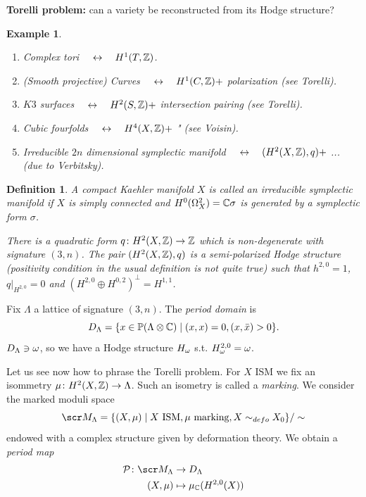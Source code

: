 \documentclass[A4paper, british, reqno]{amsart}
\theoremstyle{darkgreentheorem}
\theoremstyle{darkbluedefinition}
\newtheorem{defn}[thm]{Definition}
\theoremstyle{darkredexample}
\newtheorem{exa}[thm]{Example}
\theoremstyle{remark}
\newcommand{\1}{\mathbbm{1}}
\newcommand{\ot}{\otimes}
\newcommand{\op}{\oplus}
\newcommand{\prp}{^{\perp}}
\begin{document}
\textbf{Torelli problem:} can a variety be reconstructed from its Hodge structure?

\begin{exa}
    \begin{enumerate}
	\item Complex tori $\quad \leftrightarrow \quad H^{1}(T,\mathbb{Z})$.
	\item (Smooth projective) Curves $\quad \leftrightarrow \quad H^{1}(C,\mathbb{Z})+$ polarization (see Torelli).
	\item $K3$ surfaces $\quad \leftrightarrow \quad H^{2}(S,\mathbb{Z})+$ intersection pairing (see Torelli).
	\item Cubic fourfolds $\quad \leftrightarrow \quad H^{4}(X,\mathbb{Z})+$ " (see Voisin).
	\item Irreducible $2n$ dimensional symplectic manifold $\quad \leftrightarrow \quad (H^{2}(X,\mathbb{Z}),q)+$ ... (due to Verbitsky).
    \end{enumerate}
\end{exa}

\begin{defn}
    A compact Kaehler manifold $X$ is called an \textit{irreducible symplectic manifold} if $X$ is simply connected and $H^{0}(\Omega_{X}^{2})=\mathbb{C}\sigma $ is generated by a symplectic form $\sigma$.

    There is a quadratic form $q\colon H^{2}(X,\mathbb{Z})\to \mathbb{Z}$ which is non-degenerate with signature $(3,n)$.
    The pair $(H^{2}(X,\mathbb{Z}),q)$ is a semi-polarized Hodge structure (positivity condition in the usual definition is not quite true) such that $h^{2,0}=1$, $q|_{H^{2,0}}=0$ and $(H^{2,0}\op H^{0,2})\prp=H^{1,1}$.
\end{defn}

Fix $\Lambda$ a lattice of signature $(3,n)$.
The \textit{period domain} is
\[ D_{\Lambda}=\{ x\in \P(\Lambda \ot \C)\mid (x,x)=0,(x,\bar{x})>0 \}. \]
$D_{\Lambda}\ni \omega$, so we have a Hodge structure $H_{\omega}$ s.t. $H_{\omega}^{2,0}=\omega$.

Let us see now how to phrase the Torelli problem.
For $X$ ISM we fix an isommetry $\mu\colon H^{2}(X,\mathbb{Z})\to \Lambda$.
Such an isometry is called a \textit{marking}.
We consider the marked moduli space
\[ \M_{\Lambda}=\{(X,\mu)\mid X \text{ ISM},\mu \text{ marking}, X\sim_{defo}X_{0} \}/\sim \]
endowed with a complex structure given by deformation theory.
We obtain a \textit{period map}
\begin{align*}
    \calP\colon \M_{\Lambda}& \to D_{\Lambda} \\
    (X,\mu) & \mapsto \mu_{\C}(H^{2,0}(X))
\end{align*}
\end{document}
